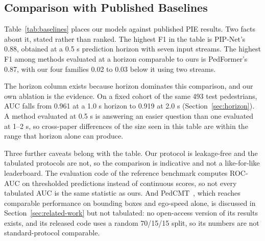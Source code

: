 \documentclass[mti,article,submit,moreauthors]{Definitions/mdpi}
\begin{document}
\subsection{Comparison with Published Baselines}

Table~\ref{tab:baselines} places our models against published PIE results. Two facts about it, stated rather than ranked. The highest F1 in the table is PIP-Net's 0.88, obtained at a 0.5 s prediction horizon with seven input streams. The highest F1 among methods evaluated at a horizon comparable to ours is PedFormer's 0.87, with our four families 0.02 to 0.03 below it using two streams.

The horizon column exists because horizon dominates this comparison, and our own ablation is the evidence. On a fixed cohort of the same 493 test pedestrians, AUC falls from 0.961 at a 1.0 s horizon to 0.919 at 2.0 s (Section~\ref{sec:horizon}). A method evaluated at 0.5 s is answering an easier question than one evaluated at 1--2 s, so cross-paper differences of the size seen in this table are within the range that horizon alone can produce.

Three further caveats belong with the table. Our protocol is leakage-free and the tabulated protocols are not, so the comparison is indicative and not a like-for-like leaderboard. The evaluation code of the reference benchmark computes ROC-AUC on thresholded predictions instead of continuous scores, so not every tabulated AUC is the same statistic as ours. And PedCMT~\citep{chen2024pedcmt}, which reaches comparable performance on bounding boxes and ego-speed alone, is discussed in Section~\ref{sec:related-work} but not tabulated: no open-access version of its results exists, and its released code uses a random 70/15/15 split, so its numbers are not standard-protocol comparable.
\end{document}
